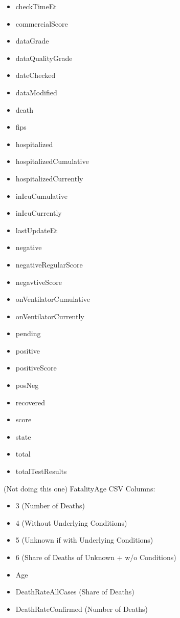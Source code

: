\documentclass[11pt]{article}
\begin{document}
\begin{itemize}
    \item checkTimeEt
    \item commercialScore
    \item dataGrade
    \item dataQualityGrade
    \item dateChecked
    \item dataModified
    \item death
    \item fips
    \item hospitalized
    \item hospitalizedCumulative
    \item hospitalizedCurrently
    \item inIcuCumulative
    \item inIcuCurrently
    \item lastUpdateEt
    \item negative
    \item negativeRegularScore
    \item negavtiveScore
    \item onVentilatorCumulative
    \item onVentilatorCurrently
    \item pending
    \item positive
    \item positiveScore
    \item posNeg
    \item recovered
    \item score
    \item state
    \item total
    \item totalTestResults
\end{itemize}


\noindent
(Not doing this one) FatalityAge CSV Columns:

\begin{itemize}
    \item 3 (Number of Deaths)
    \item 4 (Without Underlying Conditions)
    \item 5 (Unknown if with Underlying Conditions)
    \item 6 (Share of Deaths of Unknown + w/o Conditions)
    \item Age
    \item DeathRateAllCases (Share of Deaths)
    \item DeathRateConfirmed (Number of Deaths)
\end{itemize}
\end{document}
